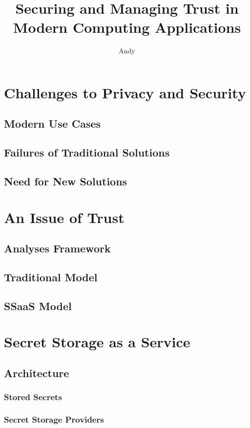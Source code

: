 \documentclass[defaultstyle,11pt]{thesis}
\title{Securing and Managing Trust in Modern Computing Applications}
\author{Andy}{Sayler}
\begin{document}




%
\chapter{Challenges to Privacy and Security}
\label{chap:challenges}

\section{Modern Use Cases}
\section{Failures of Traditional Solutions}
\section{Need for New Solutions}

%
\chapter{An Issue of Trust}
\label{chap:trust}

\section{Analyses Framework}
\section{Traditional Model}
\section{SSaaS Model}

%
\chapter{Secret Storage as a Service}
\label{chap:ssaas}

\section{Architecture}
\subsection{Stored Secrets}
\subsection{Secret Storage Providers}
\end{document}
